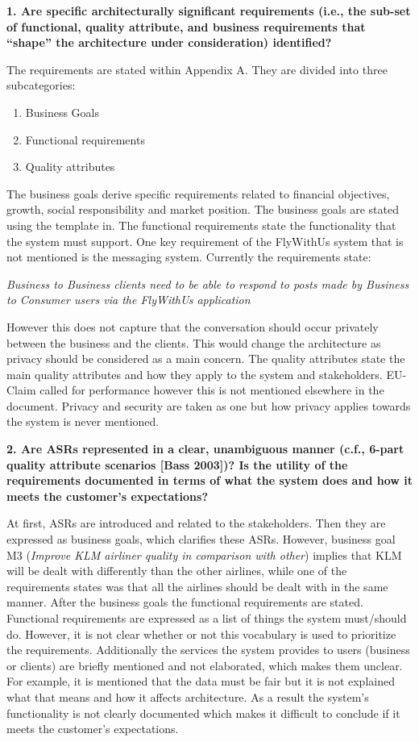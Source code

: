 \textbf{1. Are specific architecturally significant requirements (i.e., the sub-set of functional, quality attribute, and business requirements that “shape” the architecture under consideration) identified?}

The requirements are stated within Appendix A. They are divided into three subcategories: 
\begin{enumerate}
\item Business Goals
\item Functional requirements
\item Quality attributes
\end{enumerate}

The business goals derive specific requirements related to financial objectives, growth, social responsibility and market position. The business goals are stated using the template in\cite{clemens}. \newline
The functional requirements state the functionality that the system must support. One key requirement of the FlyWithUs system that is not mentioned is the messaging system. Currently the requirements state:

\emph{Business to Business clients need to be able to respond to posts made by Business to Consumer users via the FlyWithUs application}

However this does not capture that the conversation should occur privately between the business and the clients. This would change the architecture as privacy should be considered as a main concern. \newline
The quality attributes state the main quality attributes and how they apply to the system and stakeholders. EU-Claim called for performance however this is not mentioned elsewhere in the document. Privacy and security are taken as one but how privacy applies towards the system is never mentioned.

\vspace{.5cm}
\textbf{2. Are ASRs represented in a clear, unambiguous manner (c.f., 6-part quality attribute scenarios [Bass 2003])? Is the utility of the requirements documented in terms of what the system does and how it meets the customer’s expectations?}

At first, ASRs are introduced and related to the stakeholders. Then they are expressed as business goals, which clarifies these ASRs. However, business goal M3 (\textit{Improve KLM airliner quality in comparison with other}) implies that KLM will be dealt with differently than the other airlines, while one of the requirements states was that all the airlines should be dealt with in the same manner. After the business goals the functional requirements are stated. Functional requirements are expressed as a list of things the system must/should do. However, it is not clear whether or not this vocabulary is used to prioritize the requirements. Additionally the services the system provides to users (business or clients) are briefly mentioned and not elaborated, which makes them unclear. For example, it is mentioned that the data must be fair but it is not explained what that means and how it affects architecture. As a result the system's functionality is not clearly documented which makes it difficult to conclude if it meets the customer's expectations.

